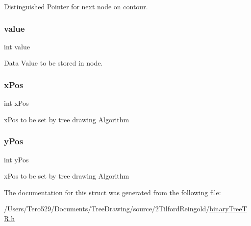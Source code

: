 Distinguished Pointer for next node on contour. 

\hypertarget{structnodes_ac4f474c82e82cbb89ca7c36dd52be0ed}{}\label{structnodes_ac4f474c82e82cbb89ca7c36dd52be0ed} 
\subsubsection{\texorpdfstring{value}{value}}
{\footnotesize\ttfamily int value}



Data Value to be stored in node. 

\hypertarget{structnodes_a6806e78862b165988ca9b855e230084e}{}\label{structnodes_a6806e78862b165988ca9b855e230084e} 
\subsubsection{\texorpdfstring{x\+Pos}{xPos}}
{\footnotesize\ttfamily int x\+Pos}



x\+Pos to be set by tree drawing Algorithm 

\hypertarget{structnodes_adbae1d6f68d046bbecaa7230baf64762}{}\label{structnodes_adbae1d6f68d046bbecaa7230baf64762} 
\subsubsection{\texorpdfstring{y\+Pos}{yPos}}
{\footnotesize\ttfamily int y\+Pos}



x\+Pos to be set by tree drawing Algorithm 



The documentation for this struct was generated from the following file\+:\begin{DoxyCompactItemize}
\item 
/\+Users/\+Tero529/\+Documents/\+Tree\+Drawing/source/2\+Tilford\+Reingold/\hyperlink{binary_tree_t_r_8h}{binary\+Tree\+T\+R.\+h}\end{DoxyCompactItemize}
